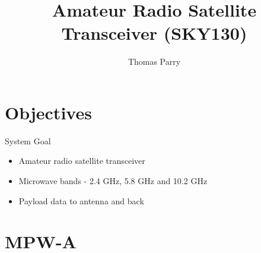 \documentclass[10pt]{beamer}
\author{Thomas Parry}
\title{Amateur Radio Satellite Transceiver (SKY130)}
\begin{document}
\begin{frame}
\titlepage
\end{frame}

\section{Objectives}

\begin{frame}{System Goal}

\begin{figure}[h]
\end{figure}

\begin{itemize}
 \item Amateur radio satellite transceiver
 \item Microwave bands - 2.4 GHz, 5.8 GHz and 10.2 GHz
 \item Payload data to antenna and back
\end{itemize}

\end{frame}


\section*{MPW-A}
\frame{\sectionpage}
\end{document}
